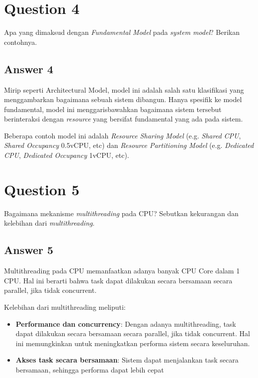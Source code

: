 \documentclass[
	11pt, %
	indonesian
]{assignment}
\begin{document}
\section*{Question 4}
\begin{problem}
Apa yang dimaksud dengan \textit{Fundamental Model} pada \textit{system model}? Berikan contohnya.
\end{problem}

\subsection*{Answer 4}
Mirip seperti Architectural Model, model ini adalah salah satu klasifikasi yang menggambarkan bagaimana sebuah sistem dibangun. Hanya spesifik ke model fundamental, model ini menggarisbawahkan bagaimana sistem tersebut berinteraksi dengan \textit{resource} yang bersifat fundamental yang ada pada sistem.

Beberapa contoh model ini adalah \textit{Resource Sharing Model} (e.g. \textit{Shared CPU}, \textit{Shared Occupancy} 0.5vCPU, etc) dan \textit{Resource Partitioning Model} (e.g. \textit{Dedicated CPU}, \textit{Dedicated Occupancy} 1vCPU, etc).

\section*{Question 5}
\begin{problem}
Bagaimana mekanisme \textit{multithreading} pada CPU\@? Sebutkan kekurangan dan kelebihan dari \textit{multithreading}.
\end{problem}

\subsection*{Answer 5}

Multithreading pada CPU memanfaatkan adanya banyak CPU Core dalam 1 CPU\@. Hal ini berarti bahwa task dapat dilakukan secara bersamaan secara parallel, jika tidak concurrent.

Kelebihan dari multithreading meliputi:
\begin{itemize}
	\item \textbf{Performance dan concurrency}: Dengan adanya multithreading, task dapat dilakukan secara bersamaan secara parallel, jika tidak concurrent. Hal ini memungkinkan untuk meningkatkan performa sistem secara keseluruhan.
	\item \textbf{Akses task secara bersamaan}: Sistem dapat menjalankan task secara bersamaan, sehingga performa dapat lebih cepat
\end{itemize}
\end{document}
